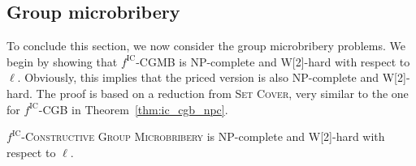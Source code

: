 \documentclass[
    12pt,               %
    a4paper,            %
    bibtotoc,           %
    pointlessnumbers,   %
    ngerman,            %
    titlepage,          %
    leqno,              %
    ]{scrarticle}       %
\newcommand\thmref{Theorem~\ref}
\begin{document}
\clearpage

\subsection{Group microbribery}

To conclude this section, we now consider the group microbribery problems. We begin by showing that $f^{\text{IC}}$-CGMB is NP-complete and W[2]-hard with respect to $\ell$. Obviously, this implies that the priced version is also NP-complete and W[2]-hard. The proof is based on a reduction from \textsc{Set Cover}, very similar to the one for $f^{\text{IC}}$-CGB in \thmref{thm:ic_cgb_npc}.

\begin{Theorem} \label{thm:ic_cgmb_npc}
$f^{\text{IC}}$-\textsc{Constructive Group Microbribery} is NP-complete and W[2]-hard with respect to $\ell$.
\end{Theorem}
\end{document}
